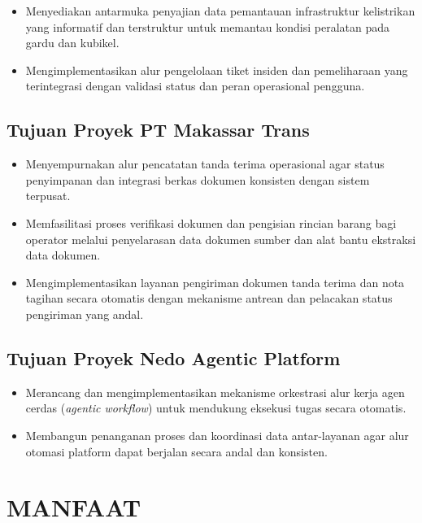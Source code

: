 \begin{itemize}[leftmargin=*, itemsep=0pt]
  \item Menyediakan antarmuka penyajian data pemantauan infrastruktur kelistrikan yang informatif dan terstruktur untuk memantau kondisi peralatan pada gardu dan kubikel.
  \item Mengimplementasikan alur pengelolaan tiket insiden dan pemeliharaan yang terintegrasi dengan validasi status dan peran operasional pengguna.
\end{itemize}

\subsection{Tujuan Proyek PT Makassar Trans}

\begin{itemize}[leftmargin=*, itemsep=0pt]
  \item Menyempurnakan alur pencatatan tanda terima operasional agar status penyimpanan dan integrasi berkas dokumen konsisten dengan sistem terpusat.
  \item Memfasilitasi proses verifikasi dokumen dan pengisian rincian barang bagi operator melalui penyelarasan data dokumen sumber dan alat bantu ekstraksi data dokumen.
  \item Mengimplementasikan layanan pengiriman dokumen tanda terima dan nota tagihan secara otomatis dengan mekanisme antrean dan pelacakan status pengiriman yang andal.
\end{itemize}

\subsection{Tujuan Proyek Nedo Agentic Platform}

\begin{itemize}[leftmargin=*, itemsep=0pt]
  \item Merancang dan mengimplementasikan mekanisme orkestrasi alur kerja agen cerdas (\textit{agentic workflow}) untuk mendukung eksekusi tugas secara otomatis.
  \item Membangun penanganan proses dan koordinasi data antar-layanan agar alur otomasi platform dapat berjalan secara andal dan konsisten.
\end{itemize}

\section{MANFAAT}

